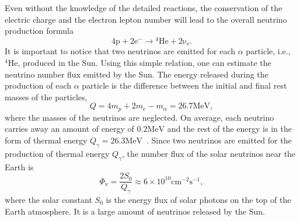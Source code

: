 Even without the knowledge of the detailed reactions, the conservation of the electric charge and the electron lepton number will lead to the overall neutrino production formula
\begin{equation}
\mathrm{4p+2e^- \to {}^4He + 2\nu_e }.
\end{equation}
It is important to notice that two neutrinos are emitted for each $\alpha$ particle, i.e., ${}^4\mathrm{He}$, produced in the Sun. Using this simple relation, one can estimate the neutrino number flux emitted by the Sun. The energy released during the production of each $\alpha$ particle is the difference between the initial and final rest masses of the particles,
\begin{equation}
Q=4m_p+2m_e-m_{\alpha}=26.7\mathrm{MeV},
\end{equation}
where the masses of the neutrinos are neglected. On average, each neutrino carries away an amount of energy of $0.2\mathrm{MeV}$ and the rest of the energy is in the form of thermal energy $Q_\gamma=26.3\mathrm{MeV}$~\cite{Adelberger2011a}. %
Since two neutrinos are emitted for the production of thermal energy $Q_\gamma$, the number flux of the solar neutrinos near the Earth is
\begin{equation}
\Phi_\nu = \frac{2 S_0}{Q_\gamma} \approx 6\times 10^{10} \mathrm{cm^{-2}s^{-1}},
\end{equation}
where the solar constant $S_0$ is the energy flux of solar photons on the top of the Earth atmosphere. It is a large amount of neutrinos released by the Sun.



